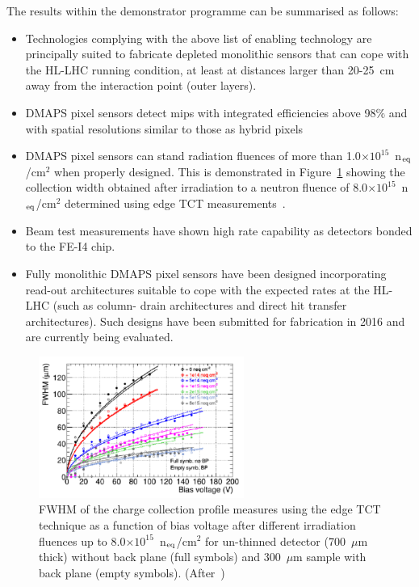The results within the demonstrator programme can be summarised as follows:
\begin{itemize}
\item Technologies complying with the above list of enabling technology are principally suited to fabricate depleted monolithic sensors that can cope with the HL-LHC running condition, at least at distances larger than 20-25~cm away from the interaction point (outer layers).
\item DMAPS pixel sensors detect mips with integrated efficiencies above 98\% 
and with spatial resolutions similar to those as hybrid pixels 
\item DMAPS pixel sensors can stand radiation fluences of more than 1.0$\times10^{15}$~n$_{\rm eq}$/cm$^2$ when properly designed. This is demonstrated in Figure~\ref{fig:Eff_DMAPS} showing the 
collection width obtained after irradiation to a neutron fluence of 8.0$\times10^{15}$~n$_{\rm eq}$/cm$^2$ 
determined using
edge TCT measurements~\cite{1748-0221-12-02-P02021,5402213}.
\item  Beam test measurements have shown high rate capability as detectors bonded to the FE-I4 chip.
\item Fully monolithic DMAPS pixel sensors have been designed incorporating read-out architectures suitable to cope with the expected rates at the HL-LHC (such as column- drain architectures and direct hit transfer architectures). Such designs have been submitted for fabrication in 2016 and are currently being evaluated.
\end{itemize}

\begin{figure}[!htbp]
   \centering
   \includegraphics[width=0.6\textwidth]{Eff_DMAPS.pdf}
   \caption{\label{fig:Eff_DMAPS}FWHM of the charge collection profile measures using the edge TCT 
   technique  as a function of bias voltage after 
   different irradiation fluences up to 8.0$\times10^{15}$~n$_{\rm eq}$/cm$^2$ for un-thinned detector 
   (700~$\mu$m thick) without back plane (full symbols) and 300~$\mu$m
    sample with back plane
(empty symbols). 
(After~\cite{1748-0221-12-02-P02021})}
\end{figure}

